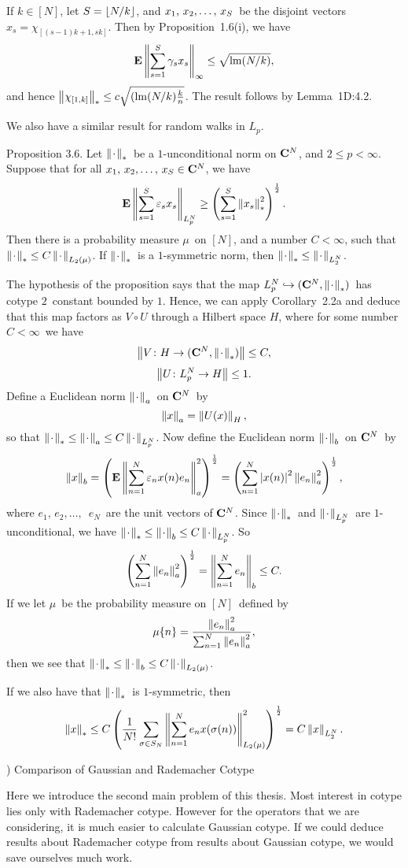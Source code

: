 \Proof If $k\in[N]$, let $S=\lfloor N/k\rfloor$, and $\xS$\ be the disjoint
vectors
$x_s=\chi_{[(s-1)k+1,sk]} $. Then by Proposition~1.6(i), we have
$$ {\bf E}\left\| \sum_{s=1}^S \gamma_s x_s \right\|_\infty \le \sqrt{\mathop{\rm lm}\nolimits (N/k)} ,$$
and hence $\left\| \chi_{[1,k]} \right\|_* \le c \sqrt{(\mathop{\rm lm}\nolimits(N/k){k\over n}}
$. The
result follows by Lemma~1D:4.2.
\endproof
 
We also have a similar result for random walks in $L_p$.
 
\proclaim Proposition 3.6. Let $\left\| \kern0.8pt\cdot\kern0.8pt \right\|_*$\ be a $1$-unconditional
norm on
${\bf C}^N$, and $2\le p<\infty$. Suppose that for all $\xS\in\C^N$, we
have
$$ {\bf E}\left\| \sum_{s=1}^S \varepsilon_s x_s \right\|_{L_p^N} \ge \left(\sum_{s=1}^S \left\| x_s \right\|_*^2\right)^{1\over2}
.$$
Then there is a probability measure $\mu$\ on $[N]$, and a number
$C<\infty$,
such that $\left\| \kern0.8pt\cdot\kern0.8pt \right\|_* \le C \left\| \kern0.8pt\cdot\kern0.8pt \right\|_{L_2(\mu)}$. If\/ $\left\| \kern0.8pt\cdot\kern0.8pt \right\|_*$\
is a
$1$-symmetric norm, then $\left\| \kern0.8pt\cdot\kern0.8pt \right\|_*\le\left\| \kern0.8pt\cdot\kern0.8pt \right\|_{L_2^N}$.
 
\Proof
The hypothesis of the proposition says that the map $L_p^N \hookrightarrow
({\bf C}^N,\left\| \kern0.8pt\cdot\kern0.8pt \right\|_*)$\ has cotype $2$\ constant bounded by $1$. Hence,
we can apply Corollary~2.2a and deduce that this map factors as
$V\circ U$ through a Hilbert space $H$, where for some number $C<\infty$\
we have
$$ \left\| V\colon H\to({\bf C}^N,\left\| \kern0.8pt\cdot\kern0.8pt \right\|_*) \right\| \le C ,$$
$$ \left\| U\colon L_p^N\to H \right\| \le 1 .$$
Define a Euclidean norm $\left\| \kern0.8pt\cdot\kern0.8pt \right\|_a$\ on ${\bf C}^N$\ by
$$ \left\| x \right\|_a = \left\| U(x) \right\|_H ,$$
so that $\left\| \kern0.8pt\cdot\kern0.8pt \right\|_*\le\left\| \kern0.8pt\cdot\kern0.8pt \right\|_a\le C\left\| \kern0.8pt\cdot\kern0.8pt \right\|_{L_p^N}$. Now define
the Euclidean
norm $\left\| \kern0.8pt\cdot\kern0.8pt \right\|_b$\ on ${\bf C}^N$\ by
$$ \left\| x \right\|_b
   = \left({\bf E}\left\| \sum_{n=1}^N \varepsilon_n x(n) e_n \right\|_a^2 \right)^{1\over2}
   = \left(\sum_{n=1}^N \left| x(n)\right|^2\left\| e_n \right\|_a^2 \right)^{1\over2} ,$$
where $e_1$, $e_2,\ldots,$\ $e_N$\ are the unit vectors of ${\bf C}^N$.
Since
$\left\| \kern0.8pt\cdot\kern0.8pt \right\|_*$\ and $\left\| \kern0.8pt\cdot\kern0.8pt \right\|_{L_p^N}$\ are $1$-unconditional, we have
$\left\| \kern0.8pt\cdot\kern0.8pt \right\|_*\le\left\| \kern0.8pt\cdot\kern0.8pt \right\|_b\le C\left\| \kern0.8pt\cdot\kern0.8pt \right\|_{L_p^N}$. So
$$ \left(\sum_{n=1}^N\left\| e_n \right\|_a^2\right)^{1\over2} = \left\| \sum_{n=1}^N e_n \right\|_b
\le C .$$
If we let
$\mu$\ be the probability measure on $[N]$\ defined by
$$ \mu\{n\} = {\left\| e_n \right\|_a^2 \over \sum_{n=1}^N \left\| e_n \right\|_a^2} ,$$
then we see that $\left\| \kern0.8pt\cdot\kern0.8pt \right\|_*
\le \left\| \kern0.8pt\cdot\kern0.8pt \right\|_b \le C\left\| \kern0.8pt\cdot\kern0.8pt \right\|_{L_2(\mu)}$.
 
If we also have that $\left\| \kern0.8pt\cdot\kern0.8pt \right\|_*$\ is $1$-symmetric, then
$$ \left\| x \right\|_*
   \le C \left({1\over N!} \sum_{\sigma\in S_N} \left\| \sum_{n=1}^N e_n
   x(\sigma(n)) \right\|_{L_2(\mu)}^2 \right)^{1\over2}
   = C \left\| x \right\|_{L_2^N} .$$
\endproof
 
\vfill
\eject
 
) Comparison of Gaussian and Rademacher Cotype
 
Here we introduce the second main problem of this thesis.
Most interest in cotype lies only with Rademacher cotype. However
for the
operators that we are considering, it is much easier to calculate
Gaussian
cotype. If we could deduce results about Rademacher cotype from results
about
Gaussian cotype, we would save ourselves much work.
 
